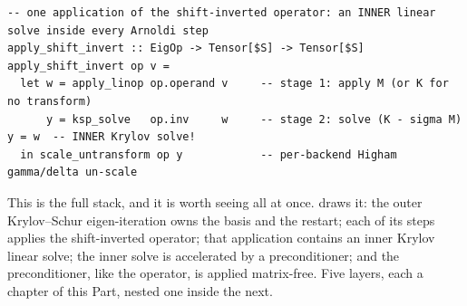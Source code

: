 \begin{lstlisting}[style=l4style]
-- one application of the shift-inverted operator: an INNER linear solve inside every Arnoldi step
apply_shift_invert :: EigOp -> Tensor[$S] -> Tensor[$S]
apply_shift_invert op v =
  let w = apply_linop op.operand v     -- stage 1: apply M (or K for no transform)
      y = ksp_solve   op.inv     w     -- stage 2: solve (K - sigma M) y = w  -- INNER Krylov solve!
  in scale_untransform op y            -- per-backend Higham gamma/delta un-scale
\end{lstlisting}

This is the full stack, and it is worth seeing all at once.  draws it: the
outer Krylov--Schur eigen-iteration owns the basis and the restart; each of its steps applies the
shift-inverted operator; that application contains an inner Krylov linear solve; the inner solve is
accelerated by a preconditioner; and the preconditioner, like the operator, is applied
matrix-free. Five layers, each a chapter of this Part, nested one inside the next.

